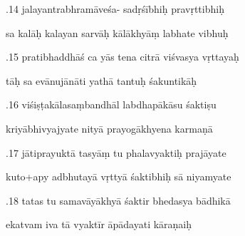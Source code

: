 \documentclass[article,12pt,a4paper]{memoir}%
\newcounter{parCount}
\begin{document}
	  
	  \pstart {}.14 jalayantrabhramāveśa- sadṛśībhiḥ pravṛttibhiḥ 
	{}
	\pend%
      

	  
	  \pstart \leavevmode%
	sa kalāḥ kalayan sarvāḥ kālākhyāṃ labhate vibhuḥ 
	{}
	\pend%
      

	  
	  \pstart {}.15 pratibhaddhāś ca yās tena citrā viśvasya vṛttayaḥ 
	{}
	\pend%
      

	  
	  \pstart \leavevmode%
	tāḥ sa evānujānāti yathā tantuḥ śakuntikāḥ 
	{}
	\pend%
      

	  
	  \pstart {}.16 viśiṣṭakālasaṃbandhāl labdhapākāsu śaktiṣu 
	{}
	\pend%
      

	  
	  \pstart \leavevmode%
	kriyābhivyajyate nityā prayogākhyena karmaṇā 
	{}
	\pend%
      

	  
	  \pstart {}.17 jātiprayuktā tasyāṃ tu phalavyaktiḥ prajāyate 
	{}
	\pend%
      

	  
	  \pstart \leavevmode%
	kuto+apy adbhutayā vṛttyā śaktibhiḥ sā niyamyate 
	{}
	\pend%
      

	  
	  \pstart {}.18 tatas tu samavāyākhyā śaktir bhedasya bādhikā 
	{}
	\pend%
      

	  
	  \pstart \leavevmode%
	ekatvam iva tā vyaktīr āpādayati kāraṇaiḥ 
	{}
	\pend%
      
\end{document}
